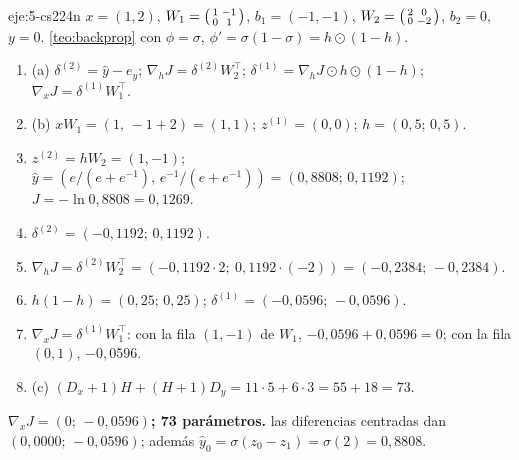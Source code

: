 \begin{solucion}{eje:5-cs224n}
\datos $x=(1,2)$, $W_1=\begin{psmallmatrix}1&-1\\0&1\end{psmallmatrix}$, $b_1=(-1,-1)$, $W_2=\begin{psmallmatrix}2&0\\0&-2\end{psmallmatrix}$, $b_2=0$, $y=0$.
\planteamiento \cref{teo:backprop} con $\phi=\sigma$, $\phi'=\sigma(1-\sigma)=h\odot(1-h)$.
\pasos
\begin{enumerate}[label=\arabic*.]
  \item (a) $\delta^{(2)}=\hat y-e_y$; $\nabla_{\!h}J=\delta^{(2)}W_2^{\top}$; $\delta^{(1)}=\nabla_{\!h}J\odot h\odot(1-h)$; $\nabla_{\!x}J=\delta^{(1)}W_1^{\top}$.
  \item (b) $xW_1=(1,\,-1+2)=(1,1)$; $z^{(1)}=(0,0)$; $h=(0{,}5;\,0{,}5)$.
  \item $z^{(2)}=hW_2=(1,-1)$; $\hat y=(e/(e+e^{-1}),\,e^{-1}/(e+e^{-1}))=(0{,}8808;\,0{,}1192)$; $J=-\ln 0{,}8808=0{,}1269$.
  \item $\delta^{(2)}=(-0{,}1192;\,0{,}1192)$.
  \item $\nabla_{\!h}J=\delta^{(2)}W_2^{\top}=(-0{,}1192\cdot 2;\ 0{,}1192\cdot(-2))=(-0{,}2384;\,-0{,}2384)$.
  \item $h(1-h)=(0{,}25;\,0{,}25)$; $\delta^{(1)}=(-0{,}0596;\,-0{,}0596)$.
  \item $\nabla_{\!x}J=\delta^{(1)}W_1^{\top}$: con la fila $(1,-1)$ de $W_1$, $-0{,}0596+0{,}0596=0$; con la fila $(0,1)$, $-0{,}0596$.
  \item (c) $(D_x+1)H+(H+1)D_y=11\cdot 5+6\cdot 3=55+18=73$.
\end{enumerate}
\resultado \textbf{$\nabla_{\!x}J=(0;\,-0{,}0596)$; 73 parámetros.}
\comprobacion las diferencias centradas dan $(0{,}0000;\,-0{,}0596)$; además $\hat y_0=\sigma(z_0-z_1)=\sigma(2)=0{,}8808$.
\end{solucion}

